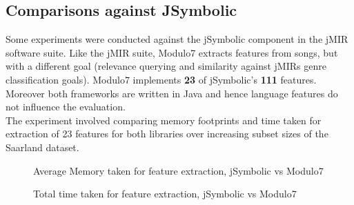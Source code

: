 \documentclass{article}
\begin{document}
\subsection{Comparisons against JSymbolic}

Some experiments were conducted against the jSymbolic component in the jMIR \cite{jMIR} software suite. Like the jMIR suite, Modulo7 extracts features from songs, but with a different goal (relevance querying and similarity against jMIRs genre classification goals). Modulo7 implements \textbf{23} of jSymbolic's \textbf{111} features. Moreover both frameworks are written in Java and hence language features do not influence the evaluation. \\ 

\noindent The experiment involved comparing memory footprints and time taken for extraction of 23 features for both libraries over increasing subset sizes of the Saarland \cite{saarlandmsd} dataset. 

\begin{figure}[h]
\begin{center}
{}
 \caption{Average Memory taken for feature extraction, jSymbolic vs Modulo7}
 \label{fig:MemoryTaken}
\end{center}
\end{figure}

\begin{figure}[h]
\begin{center}
{}
 \caption{Total time taken for feature extraction, jSymbolic vs Modulo7}
 \label{fig:TimeTaken}
\end{center}
\end{figure}
\end{document}
